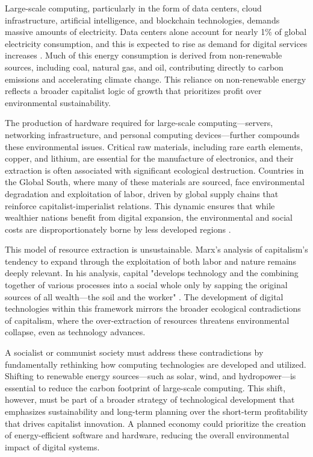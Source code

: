 \begin{refsection}
Large-scale computing, particularly in the form of data centers, cloud infrastructure, artificial intelligence, and blockchain technologies, demands massive amounts of electricity. Data centers alone account for nearly 1\% of global electricity consumption, and this is expected to rise as demand for digital services increases \cite[pp.~217]{masanet_energy_datacenters}. Much of this energy consumption is derived from non-renewable sources, including coal, natural gas, and oil, contributing directly to carbon emissions and accelerating climate change. This reliance on non-renewable energy reflects a broader capitalist logic of growth that prioritizes profit over environmental sustainability.

The production of hardware required for large-scale computing—servers, networking infrastructure, and personal computing devices—further compounds these environmental issues. Critical raw materials, including rare earth elements, copper, and lithium, are essential for the manufacture of electronics, and their extraction is often associated with significant ecological destruction. Countries in the Global South, where many of these materials are sourced, face environmental degradation and exploitation of labor, driven by global supply chains that reinforce capitalist-imperialist relations. This dynamic ensures that while wealthier nations benefit from digital expansion, the environmental and social costs are disproportionately borne by less developed regions \cite[pp.~151]{jackson_material_concern}.

This model of resource extraction is unsustainable. Marx’s analysis of capitalism’s tendency to expand through the exploitation of both labor and nature remains deeply relevant. In his analysis, capital "develops technology and the combining together of various processes into a social whole only by sapping the original sources of all wealth—the soil and the worker" \cite[pp.~638]{marx_capital_vol1}. The development of digital technologies within this framework mirrors the broader ecological contradictions of capitalism, where the over-extraction of resources threatens environmental collapse, even as technology advances.

A socialist or communist society must address these contradictions by fundamentally rethinking how computing technologies are developed and utilized. Shifting to renewable energy sources—such as solar, wind, and hydropower—is essential to reduce the carbon footprint of large-scale computing. This shift, however, must be part of a broader strategy of technological development that emphasizes sustainability and long-term planning over the short-term profitability that drives capitalist innovation. A planned economy could prioritize the creation of energy-efficient software and hardware, reducing the overall environmental impact of digital systems.


\end{refsection}
